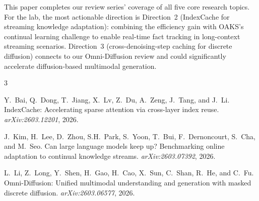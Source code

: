 \documentclass[11pt]{article}
\begin{document}
This paper completes our review series' coverage of all five core research topics. For the lab, the most actionable direction is Direction~2 (IndexCache for streaming knowledge adaptation): combining the efficiency gain with OAKS's continual learning challenge to enable real-time fact tracking in long-context streaming scenarios. Direction~3 (cross-denoising-step caching for discrete diffusion) connects to our Omni-Diffusion review and could significantly accelerate diffusion-based multimodal generation.


\begin{thebibliography}{3}

Y.~Bai, Q.~Dong, T.~Jiang, X.~Lv, Z.~Du, A.~Zeng, J.~Tang, and J.~Li.
\newblock IndexCache: Accelerating sparse attention via cross-layer index reuse.
\newblock \emph{arXiv:2603.12201}, 2026.

J.~Kim, H.~Lee, D.~Zhou, S.H.~Park, S.~Yoon, T.~Bui, F.~Dernoncourt, S.~Cha, and M.~Seo.
\newblock Can large language models keep up? Benchmarking online adaptation to continual knowledge streams.
\newblock \emph{arXiv:2603.07392}, 2026.

L.~Li, Z.~Long, Y.~Shen, H.~Gao, H.~Cao, X.~Sun, C.~Shan, R.~He, and C.~Fu.
\newblock Omni-Diffusion: Unified multimodal understanding and generation with masked discrete diffusion.
\newblock \emph{arXiv:2603.06577}, 2026.

\end{thebibliography}
\end{document}
